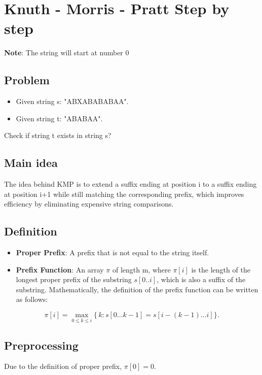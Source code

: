 \section{Knuth - Morris - Pratt Step by step}
\textbf{Note}: The string will start at number 0

\subsection{Problem}
\begin{itemize}
    \item Given string s: "ABXABABABAA".
    \item Given string t: "ABABAA".
\end{itemize}

Check if string t exists in string s?

\subsection{Main idea}

The idea behind KMP is to extend a suffix ending at position i to a suffix ending at position i+1 while still matching the corresponding prefix, which improves efficiency by eliminating expensive string comparisons. \cite{vnoi}


\subsection{Definition}
\begin{itemize}
    \item \textbf{Proper Prefix}: A prefix that is not equal to the string itself.

    \item \textbf{Prefix Function}\cite{cpAlgo}: An array $\pi$ of length m, where $\pi[i]$ is the length of the longest proper prefix of the substring $s[0..i]$, which is also a suffix of the substring. Mathematically, the definition of the prefix function can be written as follows:
\end{itemize}
\begin{equation}
    \pi[i] = \max_{0 \le k \le i} \{\,k : s[0 \dots k-1] = s[i-(k-1) \dots i]\}.
\end{equation}

\subsection{Preprocessing}
Due to the definition of proper prefix, $\pi[0] = 0$.

